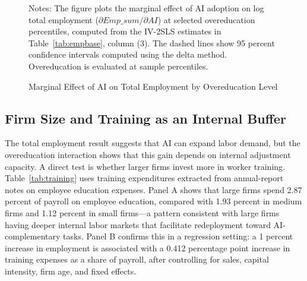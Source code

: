 \documentclass[12pt,a4paper]{article}
\theoremstyle{predstyle}
\theoremstyle{plain}
\begin{document}
\begin{figure}[H]
\centering
{}
\caption{Marginal Effect of AI on Total Employment by Overeducation Level}
\label{fig:marginal}
\begin{minipage}{0.86\textwidth}
\footnotesize
Notes: The figure plots the marginal effect of AI adoption on log total employment (\(\partial Emp\_sum / \partial AI\)) at selected overeducation percentiles, computed from the IV-2SLS estimates in Table~\ref{tab:empbase}, column (3). The dashed lines show 95 percent confidence intervals computed using the delta method. Overeducation is evaluated at sample percentiles.
\end{minipage}
\end{figure}

\subsection{Firm Size and Training as an Internal Buffer}

The total employment result suggests that AI can expand labor demand, but the overeducation interaction shows that this gain depends on internal adjustment capacity. A direct test is whether larger firms invest more in worker training. Table~\ref{tab:training} uses training expenditures extracted from annual-report notes on employee education expenses. Panel A shows that large firms spend 2.87 percent of payroll on employee education, compared with 1.93 percent in medium firms and 1.12 percent in small firms---a pattern consistent with large firms having deeper internal labor markets that facilitate redeployment toward AI-complementary tasks. Panel B confirms this in a regression setting: a 1 percent increase in employment is associated with a 0.412 percentage point increase in training expenses as a share of payroll, after controlling for sales, capital intensity, firm age, and fixed effects.
\end{document}
